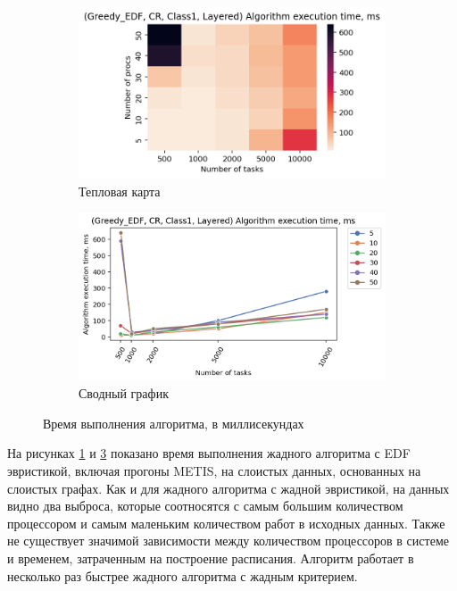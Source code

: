 \begin{figure}[!htbp]
    \centering
    \begin{subfigure}{0.49\textwidth}
        \includegraphics[width=\textwidth]{imgs/layered_class_1/CR_EDF/et_heatmap.png}
        \caption{Тепловая карта}
        \label{fig:CR-layered-EDF-exec-time-heatmap}
    \end{subfigure}
    \hfill
    \begin{subfigure}{0.49\textwidth}
        \includegraphics[width=\textwidth]{imgs/layered_class_1/CR_EDF/tr_graph.png}
        \caption{Сводный график}
        \label{fig:CR-layered-EDF-exec-time-compiled}
    \end{subfigure}
    \caption{Время выполнения алгоритма, в миллисекундах}
\end{figure}

На рисунках \ref{fig:CR-layered-EDF-exec-time-heatmap} и \ref{fig:CR-layered-EDF-exec-time-compiled} показано время выполнения жадного алгоритма с EDF эвристикой, включая прогоны METIS, на слоистых данных, основанных на слоистых графах. Как и для жадного алгоритма с жадной эвристикой, на данных видно два выброса, которые соотносятся с самым большим количеством процессором и самым маленьким количеством работ в исходных данных. Также не существует значимой зависимости между количеством процессоров в системе и временем, затраченным на построение расписания. Алгоритм работает в несколько раз быстрее жадного алгоритма с жадным критерием.

